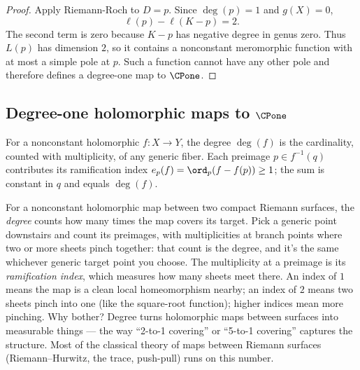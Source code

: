 \begin{proof}\leanok
Apply Riemann-Roch to \(D=p\). Since \(\deg(p)=1\) and \(g(X)=0\),
\[
  \ell(p)-\ell(K-p)=2.
\]
The second term is zero because \(K-p\) has negative degree in genus zero.
Thus \(L(p)\) has dimension \(2\), so it contains a nonconstant meromorphic
function with at most a simple pole at \(p\). Such a function cannot have any
other pole and therefore defines a degree-one map to \(\CPone\).
\end{proof}

\subsection{Degree-one holomorphic maps to \texorpdfstring{\(\CPone\)}{CP1}}

\begin{definition}
\label{def:branched-degree}
For a nonconstant holomorphic \(f:X\to Y\), the degree \(\deg(f)\) is
the cardinality, counted with multiplicity, of any generic fiber. Each
preimage \(p\in f^{-1}(q)\) contributes its ramification index
\(e_p(f)=\ord_p(f - f(p))\ge 1\); the sum is constant in \(q\) and
equals \(\deg(f)\).
\leanok
\end{definition}

\begin{layman}
For a nonconstant holomorphic map between two compact Riemann surfaces,
the \emph{degree} counts how many times the map covers its target.
Pick a generic point downstairs and count its preimages, with
multiplicities at branch points where two or more sheets pinch together:
that count is the degree, and it's the same whichever generic target
point you choose. The multiplicity at a preimage is its
\emph{ramification index}, which measures how many sheets meet there. An
index of \(1\) means the map is a clean local homeomorphism nearby; an
index of \(2\) means two sheets pinch into one (like the square-root
function); higher indices mean more pinching. Why bother? Degree turns
holomorphic maps between surfaces into measurable things — the way
``2-to-1 covering'' or ``5-to-1 covering'' captures the structure. Most
of the classical theory of maps between Riemann surfaces (Riemann–Hurwitz,
the trace, push-pull) runs on this number.
\end{layman}


